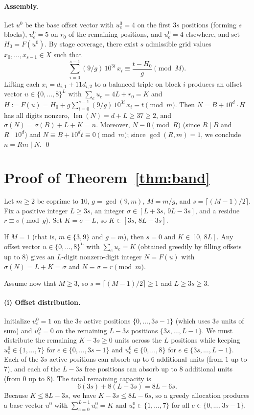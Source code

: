 \documentclass[11pt]{article}
\theoremstyle{remark}
\newcommand{\sig}{\sigma}
\begin{document}
\paragraph{Assembly.} Let $u^0$ be the base offset vector with $u^0_e = 4$ on
the first $3s$ positions (forming $s$ blocks), $u^0_e = 5$ on $r_0$ of the
remaining positions, and $u^0_e = 4$ elsewhere, and set $H_0 = F(u^0)$. By
stage coverage, there exist $s$ admissible grid values $x_0,\dots,x_{s-1} \in X$
such that
\[
 \sum_{i=0}^{s-1} (9/g)\,10^{3i}\,x_i \equiv \frac{t - H_0}{g} \pmod M .
\]
Lifting each $x_i = d_{i,1} + 11 d_{i,2}$ to a balanced triple on block $i$
produces an offset vector $u \in \{0,\dots,8\}^L$ with $\sum_e u_e = 4L + r_0 = K$
and $H := F(u) = H_0 + g \sum_{i=0}^{s-1} (9/g)\,10^{3i}\,x_i \equiv t \pmod m$.
Then $N = B + 10^d \cdot H$ has all digits nonzero, $\operatorname{len}(N) = d + L \ge 37 \ge 2$,
and $\sig(N) = \sig(B) + L + K = n$. Moreover, $N \equiv 0 \pmod R$ (since
$R \mid B$ and $R \mid 10^d$) and $N \equiv B + 10^d t \equiv 0 \pmod m$; since
$\gcd(R,m)=1$, we conclude $n = Rm \mid N$. \qed

\section{Proof of Theorem~\ref{thm:band}}
\label{sec:band}

Let $m \ge 2$ be coprime to $10$, $g = \gcd(9,m)$, $M = m/g$, and
$s = \lceil (M-1)/2 \rceil$. Fix a positive integer $L \ge 3s$, an
integer $\sig \in [L+3s,\,9L-3s]$, and a residue
$r \equiv \sig \pmod g$. Set $K = \sig - L$, so $K \in [3s,\,8L-3s]$.

If $M = 1$ (that is, $m \in \{3,9\}$ and $g = m$), then $s = 0$ and
$K \in [0,\,8L]$. Any offset vector $u \in \{0,\dots,8\}^L$ with $\sum_e u_e = K$
(obtained greedily by filling offsets up to $8$) gives an $L$-digit nonzero-digit
integer $N = F(u)$ with $\sig(N) = L + K = \sig$ and
$N \equiv \sig \equiv r \pmod m$.

Assume now that $M \ge 3$, so $s = \lceil (M-1)/2 \rceil \ge 1$ and $L \ge 3s \ge 3$.

\paragraph{(i) Offset distribution.} Initialize $u^0_e = 1$ on the $3s$ active
positions $\{0,\dots,3s-1\}$ (which uses $3s$ units of sum) and $u^0_e = 0$ on
the remaining $L - 3s$ positions $\{3s,\dots,L-1\}$. We must distribute the
remaining $K - 3s \ge 0$ units across the $L$ positions while keeping
$u^0_e \in \{1,\dots,7\}$ for $e \in \{0,\dots,3s-1\}$ and
$u^0_e \in \{0,\dots,8\}$ for $e \in \{3s,\dots,L-1\}$. Each of the $3s$ active
positions can absorb up to $6$ additional units (from $1$ up to $7$), and each
of the $L - 3s$ free positions can absorb up to $8$ additional units (from $0$
up to $8$). The total remaining capacity is
\[
 6(3s) + 8(L - 3s) = 8L - 6s .
\]
Because $K \le 8L - 3s$, we have $K - 3s \le 8L - 6s$, so a greedy allocation
produces a base vector $u^0$ with $\sum_{e=0}^{L-1} u^0_e = K$ and
$u^0_e \in \{1,\dots,7\}$ for all $e \in \{0,\dots,3s-1\}$.
\end{document}
